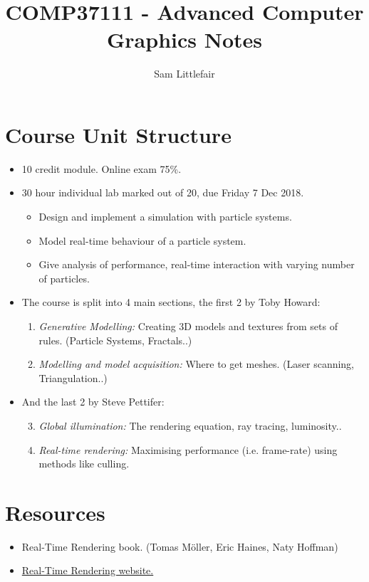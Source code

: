 \documentclass[11pt]{article}
\title{COMP37111 - Advanced Computer Graphics Notes}
\author{Sam Littlefair}
\begin{document}
\maketitle


\section{Course Unit Structure}
\begin{itemize}
  \item 10 credit module. Online exam 75\%.

  \item 30 hour individual lab marked out of 20, due Friday 7 Dec 2018.
  \begin{itemize}
    \item Design  and implement a simulation with particle systems.
    \item Model real-time behaviour of a particle system.
    \item Give analysis of performance, real-time interaction with varying number of particles.
  \end{itemize}
\end{itemize}

\begin{itemize}
\item The course is split into 4 main sections, the first 2 by Toby Howard:
\begin{enumerate}
  \item \textit{Generative Modelling:} Creating 3D models and textures from sets of rules. (Particle Systems, Fractals..)
  \item \textit{Modelling and model acquisition:} Where to get meshes. (Laser scanning, Triangulation..)
\end{enumerate}

\item And the last 2 by Steve Pettifer:
\begin{enumerate}
  \setcounter{enumi}{2}
  \item \textit{Global illumination:} The rendering equation, ray tracing, luminosity..
  \item \textit{Real-time rendering:} Maximising performance (i.e. frame-rate) using methods like culling.
\end{enumerate}
\end{itemize}
\section{Resources}
\begin{itemize}
  \item Real-Time Rendering book. (Tomas Möller, Eric Haines, Naty Hoffman)
  \item \href{http://www.realtimerendering.com/}{Real-Time Rendering website.}
\end{itemize}
\end{document}
